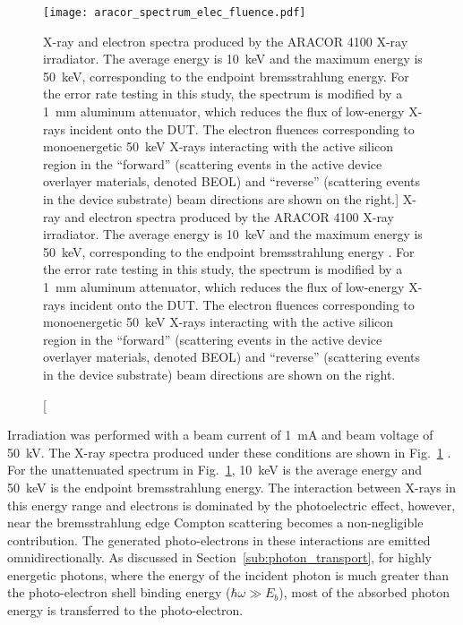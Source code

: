 \begin{figure}[tb]
    \centering
        \texttt{[image: aracor\_spectrum\_elec\_fluence.pdf]}
        \caption
        [X-ray and electron spectra produced by the ARACOR 4100 X-ray irradiator. The average energy is 10~keV and the maximum energy is 50~keV, corresponding to the endpoint bremsstrahlung energy. For the error rate testing in this study, the spectrum is modified by a 1~mm aluminum attenuator, which reduces the flux of low-energy X-rays incident onto the DUT. The electron fluences corresponding to monoenergetic 50~keV X-rays interacting with the active silicon region in the ``forward'' (scattering events in the active device overlayer materials, denoted BEOL) and ``reverse'' (scattering events in the device substrate) beam directions are shown on the right.]
        {X-ray and electron spectra produced by the ARACOR 4100 X-ray irradiator. The average energy is 10~keV and the maximum energy is 50~keV, corresponding to the endpoint bremsstrahlung energy \cite{Dozier:1983wx, Fleetwood:1986ug}. For the error rate testing in this study, the spectrum is modified by a 1~mm aluminum attenuator, which reduces the flux of low-energy X-rays incident onto the DUT. The electron fluences corresponding to monoenergetic 50~keV X-rays interacting with the active silicon region in the ``forward'' (scattering events in the active device overlayer materials, denoted BEOL) and ``reverse'' (scattering events in the device substrate) beam directions are shown on the right.}
        \label{fig:aracor_spectrum}
\end{figure}
Irradiation was performed with a beam current of 1~mA and beam voltage of 50~kV. 
The X-ray spectra produced under these conditions are shown in Fig.~\ref{fig:aracor_spectrum} \cite{Dozier:1983wx, Fleetwood:1986ug}. 
For the unattenuated spectrum in Fig.~\ref{fig:aracor_spectrum}, 10~keV is the average energy and 50~keV is the endpoint bremsstrahlung energy. 
The interaction between X-rays in this energy range and electrons is dominated by the photoelectric effect, however, near the bremsstrahlung edge Compton scattering becomes a non-negligible contribution. 
The generated photo-electrons in these interactions are emitted omnidirectionally.
As discussed in Section~\ref{sub:photon_transport}, for highly energetic photons, where the energy of the incident photon is much greater than the photo-electron shell binding energy ($\hbar \omega \gg E_b$), most of the absorbed photon energy is transferred to the photo-electron.

